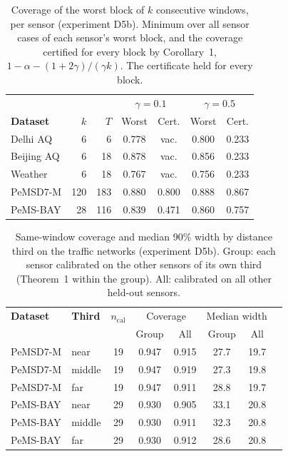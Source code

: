 \begin{table}[htbp]
\caption{Coverage of the worst block of $k$ consecutive windows, per sensor (experiment D5b). Minimum over all sensor cases of each sensor's worst block, and the coverage certified for every block by Corollary~1, $1-\alpha-(1+2\gamma)/(\gamma k)$. The certificate held for every block.}
\label{tab:d5b}
\centering\footnotesize
\begin{tabular}{lrrcccc}
\toprule
 & & & \multicolumn{2}{c}{$\gamma=0.1$} & \multicolumn{2}{c}{$\gamma=0.5$} \\
\textbf{Dataset} & $k$ & $T$ & Worst & Cert. & Worst & Cert. \\
\midrule
Delhi AQ & 6 & 6 & 0.778 & vac. & 0.800 & 0.233 \\
Beijing AQ & 6 & 18 & 0.878 & vac. & 0.856 & 0.233 \\
Weather & 6 & 18 & 0.767 & vac. & 0.756 & 0.233 \\
PeMSD7-M & 120 & 183 & 0.880 & 0.800 & 0.888 & 0.867 \\
PeMS-BAY & 28 & 116 & 0.839 & 0.471 & 0.860 & 0.757 \\
\bottomrule
\end{tabular}
\end{table}

\begin{table}[htbp]
\caption{Same-window coverage and median 90\% width by distance third on the traffic networks (experiment D5b). Group: each sensor calibrated on the other sensors of its own third (Theorem~1 within the group). All: calibrated on all other held-out sensors.}
\label{tab:groups}
\centering\footnotesize
\begin{tabular}{llcccccc}
\toprule
\textbf{Dataset} & \textbf{Third} & $n_\mathrm{cal}$ & \multicolumn{2}{c}{Coverage} & \multicolumn{2}{c}{Median width} \\
 & & & Group & All & Group & All \\
\midrule
PeMSD7-M & near & 19 & 0.947 & 0.915 & 27.7 & 19.7 \\
PeMSD7-M & middle & 19 & 0.947 & 0.919 & 27.3 & 19.8 \\
PeMSD7-M & far & 19 & 0.947 & 0.911 & 28.8 & 19.7 \\
PeMS-BAY & near & 29 & 0.930 & 0.905 & 33.1 & 20.8 \\
PeMS-BAY & middle & 29 & 0.930 & 0.911 & 32.3 & 20.8 \\
PeMS-BAY & far & 29 & 0.930 & 0.912 & 28.6 & 20.8 \\
\bottomrule
\end{tabular}
\end{table}


